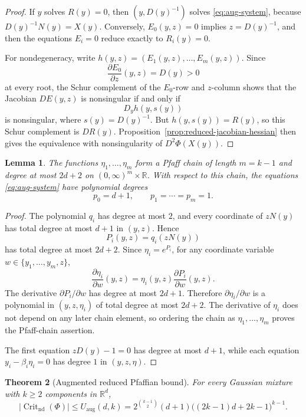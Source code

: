 \documentclass[11pt]{article}
\theoremstyle{plain}
\newtheorem{theorem}{Theorem}[section]
\newtheorem{lemma}[theorem]{Lemma}
\theoremstyle{definition}
\theoremstyle{remark}
\numberwithin{equation}{section}
\DeclareMathOperator{\Crit}{Crit}
\newcommand{\R}{\mathbb{R}}
\begin{document}
\begin{proof}
If $y$ solves $R(y)=0$, then $(y,D(y)^{-1})$ solves \eqref{eq:aug-system}, because $D(y)^{-1}N(y)=X(y)$. Conversely, $E_0(y,z)=0$ implies $z=D(y)^{-1}$, and then the equations $E_i=0$ reduce exactly to $R_i(y)=0$.

For nondegeneracy, write $h(y,z)=(E_1(y,z),\dots,E_m(y,z))$. Since
\[
\frac{\partial E_0}{\partial z}(y,z)=D(y)>0
\]
at every root, the Schur complement of the $E_0$-row and $z$-column shows that the Jacobian $DE(y,z)$ is nonsingular if and only if
\[
D_y h(y,s(y))
\]
is nonsingular, where $s(y)=D(y)^{-1}$. But $h(y,s(y))=R(y)$, so this Schur complement is $DR(y)$. Proposition~\ref{prop:reduced-jacobian-hessian} then gives the equivalence with nonsingularity of $D^2\Phi(X(y))$.
\end{proof}

\begin{lemma}\label{lem:aug-pfaff}
The functions $\eta_1,\dots,\eta_m$ form a Pfaff chain of length $m=k-1$ and degree at most $2d+2$ on $(0,\infty)^m\times\R$. With respect to this chain, the equations \eqref{eq:aug-system} have polynomial degrees
\[
p_0=d+1,
\qquad
p_1=\cdots=p_m=1.
\]
\end{lemma}

\begin{proof}
The polynomial $q_i$ has degree at most $2$, and every coordinate of $zN(y)$ has total degree at most $d+1$ in $(y,z)$. Hence
\[
P_i(y,z)=q_i(zN(y))
\]
has total degree at most $2d+2$. Since $\eta_i=e^{P_i}$, for any coordinate variable $w\in\{y_1,\dots,y_m,z\}$,
\[
\frac{\partial \eta_i}{\partial w}(y,z)
=\eta_i(y,z)\frac{\partial P_i}{\partial w}(y,z).
\]
The derivative $\partial P_i/\partial w$ has degree at most $2d+1$. Therefore $\partial\eta_i/\partial w$ is a polynomial in $(y,z,\eta_i)$ of total degree at most $2d+2$. The derivative of $\eta_i$ does not depend on any later chain element, so ordering the chain as $\eta_1,\dots,\eta_m$ proves the Pfaff-chain assertion.

The first equation $zD(y)-1=0$ has degree at most $d+1$, while each equation $y_i-\beta_i\eta_i=0$ has degree $1$ in $(y,z,\eta)$.
\end{proof}

\begin{theorem}[Augmented reduced Pfaffian bound]\label{thm:augmented-bound}
For every Gaussian mixture with $k\ge 2$ components in $\R^d$,
\[
|\Crit_{\mathrm{nd}}(\Phi)|\le U_{\mathrm{aug}}(d,k)
=2^{\binom{k-1}{2}}(d+1)\bigl((2k-1)d+2k-1\bigr)^{k-1}.
\]
\end{theorem}
\end{document}
